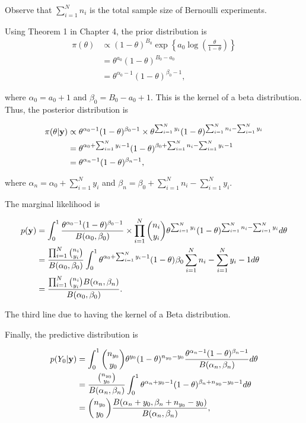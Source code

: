\begin{enumerate}[leftmargin=*]
Observe that $\sum_{i=1}^N n_i$ is the total sample size of Bernoulli experiments. 

Using Theorem 1 in Chapter 4, the prior distribution is \begin{align*}\pi(\theta)&\propto(1-\theta)^{B_0}\exp\left\{a_0\log\left(\frac{\theta}{1-\theta}\right)\right\}\\
	&=\theta^{a_0}(1-\theta)^{B_0-a_0}\\
	&=\theta^{\alpha_0-1}(1-\theta)^{\beta_0-1},
\end{align*}

where $\alpha_0=a_0+1$ and $\beta_0=B_0-a_0+1$. This is the kernel of a beta distribution. Thus, the posterior distribution is

\begin{align*}
	\pi(\theta|{\bf{y}})&\propto \theta^{\alpha_0-1}(1-\theta)^{\beta_0-1} \times \theta^{\sum_{i=1}^Ny_i}(1-\theta)^{\sum_{i=1}^N n_i-\sum_{i=1}^N y_i}\\
	&=\theta^{\alpha_0+\sum_{i=1}^Ny_i - 1}(1-\theta)^{\beta_0 + \sum_{i=1}^N n_i-\sum_{i=1}^N y_i - 1}\\
	&=\theta^{\alpha_n-1}(1-\theta)^{\beta_n-1},  
\end{align*}

where $\alpha_n = \alpha_0+\sum_{i=1}^Ny_i$ and $\beta_n=\beta_0 + \sum_{i=1}^N n_i-\sum_{i=1}^N y_i$.

The marginal likelihood is

\begin{align*}
	p({\bf{y}})&=\int_0^1 \frac{\theta^{\alpha_0-1}(1-\theta)^{\beta_0-1}}{B(\alpha_0,\beta_0)}\times \prod_{i=1}^N{n_i \choose y_i}\theta^{\sum_{i=1}^Ny_i}(1-\theta)^{\sum_{i=1}^N n_i-\sum_{i=1}^N y_i} d\theta\\
	&=\frac{ \prod_{i=1}^N{n_i \choose y_i}}{B(\alpha_0,\beta_0)}\int_0^1 \theta^{\alpha_0+\sum_{i=1}^Ny_i-1}(1-\theta)^{}\beta_0\sum_{i=1}^N n_i-\sum_{i=1}^N y_i-1 d\theta\\
	&=\frac{ \prod_{i=1}^N{n_i \choose y_i}B(\alpha_n,\beta_n)}{B(\alpha_0,\beta_0)}. 
\end{align*}

The third line due to having the kernel of a Beta distribution.

Finally, the predictive distribution is

\begin{align*}
	p(Y_0|{\bf{y}})&=\int_0^1 {n_{y_0} \choose y_0} \theta^{y_0}(1-\theta)^{n_{y_0}-y_0}\frac{\theta^{\alpha_n-1}(1-\theta)^{\beta_n-1}}{B(\alpha_n,\beta_n)}d\theta\\
	&=\frac{{n_{y_0} \choose y_0}}{B(\alpha_n,\beta_n)}\int_0^1  \theta^{\alpha_n+y_0-1}(1-\theta)^{\beta_n+n_{y_0}-y_0-1}d\theta\\
	&={n_{y_0} \choose y_0}\frac{B(\alpha_n+y_0,\beta_n+n_{y_0}-y_0)}{B(\alpha_n,\beta_n)},
\end{align*}


\end{enumerate}

